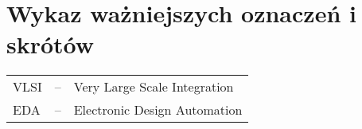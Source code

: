 \section*{Wykaz ważniejszych oznaczeń i skrótów}
\label{sec:oznaczenia_i_skroty}
\begin{tabular}{l l l}
    VLSI & -- & Very Large Scale Integration \\
    EDA & -- & Electronic Design Automation \\
\end{tabular}
    